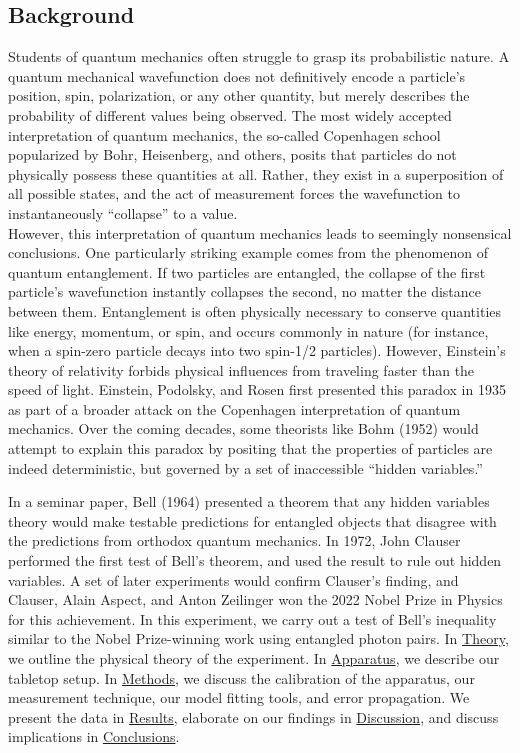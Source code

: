 \documentclass[letter,scriptaddress,twocolumn, prl, nofootinbib]{revtex4}
\begin{document}
\subsection{Background}
\indent Students of quantum mechanics often struggle to grasp its probabilistic nature. A quantum mechanical wavefunction does not definitively encode a particle's position, spin, polarization, or any other quantity, but merely describes the probability of different values being observed. The most widely accepted interpretation of quantum mechanics, the so-called Copenhagen school popularized by Bohr, Heisenberg, and others, posits that particles do not physically possess these quantities at all. Rather, they exist in a superposition of all possible states, and the act of measurement forces the wavefunction to instantaneously ``collapse'' to a value. \\ 
\indent However, this interpretation of quantum mechanics leads to seemingly nonsensical conclusions. One particularly striking example comes from the phenomenon of quantum entanglement. If two particles are entangled, the collapse of the first particle's wavefunction instantly collapses the second, no matter the distance between them. Entanglement is often physically necessary to conserve quantities like energy, momentum, or spin, and occurs commonly in nature (for instance, when a spin-zero particle decays into two spin-1/2 particles). However, Einstein's theory of relativity forbids physical influences from traveling faster than the speed of light. Einstein, Podolsky, and Rosen first presented this paradox in 1935 as part of a broader attack on the Copenhagen interpretation of quantum mechanics. Over the coming decades, some theorists like Bohm (1952) would attempt to explain this paradox by positing that the properties of particles are indeed deterministic, but governed by a set of inaccessible ``hidden variables.''

In a seminar paper, Bell (1964) presented a theorem that any hidden variables theory would make testable predictions for entangled objects that disagree with the predictions from orthodox quantum mechanics. In 1972, John Clauser performed the first test of Bell's theorem, and used the result to rule out hidden variables. A set of later experiments would confirm Clauser's finding, and Clauser, Alain Aspect, and Anton Zeilinger won the 2022 Nobel Prize in Physics for this achievement. In this experiment, we carry out a test of Bell's inequality similar to the Nobel Prize-winning work using entangled photon pairs. In \hyperref[subsec:theory]{Theory}, we outline the physical theory of the experiment. In \hyperref[sec:apparatus]{Apparatus}, we describe our tabletop setup. In \hyperref[sec:methods]{Methods}, we discuss the calibration of the apparatus, our measurement technique, our model fitting tools, and error propagation. We present the data in \hyperref[sec:results]{Results}, elaborate on our findings in \hyperref[sec:discussion]{Discussion}, and discuss implications in \hyperref[sec:discussion]{Conclusions}.
\end{document}
